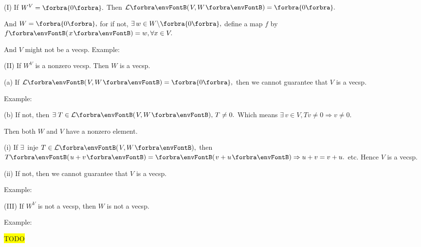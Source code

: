 \documentclass[a4paper, 11pt, UTF8]{article}
\begin{document}
\begin{large}
\SepLine

\par\quad
(I) If $W^V=\zeroSubs.$ Then $\Lm{V,W}=\zeroSubs.$\par\quad\HI
And $W=\zeroSubs,$ for if not, $\exists\,w\in W\backslash\zeroSubs,$ define a map $f$ by $f\Par{x}=w,\forall x\in V.$\par\quad\HI
And $V$ might not be a vecsp. Example: \par\quad\EndI
(II) If $W^V$ is a nonzero vecsp. Then $W$ is a vecsp.\par\quad\HII
(a) If $\Lm{V,W}=\zeroSubs,$ then we cannot guarantee that $V$ is a vecsp.\par\quad\HII\Ha
Example: \par\quad\HII
(b) If not, then $\exists\;T\in\Lm{V,W},\,T\neq 0.$ Which means $\exists\,v\in V,Tv\neq 0\Rightarrow v\neq 0.$\par\quad\HII\Hb
Then both $W$ and $V$ have a nonzero element.\par\quad\HII\Hb
(i) If $\exists\,$ inje $T\in\Lm{V,W},$ then $T\Par{u+v}=\Par{v+u}\Rightarrow u+v=v+u.$ etc. Hence $V$ is a vecsp.\par\quad\HII\Ha\Endi
(ii) If not, then we cannot guarantee that $V$ is a vecsp.\par\quad\HII\Hb\Hii
Example: \par\quad\EndII
(III) If $W^V$ is not a vecsp, then $W$ is not a vecsp. \par\quad\HIII
Example: \par\quad
\colorbox{yellow}{TODO}\PfEnd
\SepLine\pagebreak


\end{large}
\end{document}
